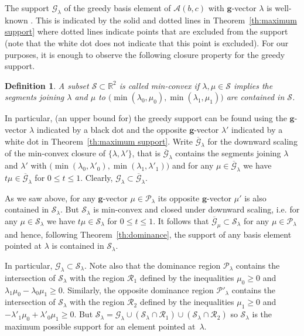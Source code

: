 \documentclass{amsart}
\newtheorem{definition}[theorem]{Definition}
\numberwithin{theorem}{section}
\newcommand{\bfg}{\boldsymbol{g}}
\newcommand{\cA}{\mathcal{A}}
\newcommand{\cG}{\mathcal{G}}
\newcommand{\cP}{\mathcal{P}}
\newcommand{\cR}{\mathcal{R}}
\newcommand{\cS}{\mathcal{S}}
\newcommand{\RR}{\mathbb{R}}
\begin{document}
  The support $\cG_\lambda$ of the greedy basis element of $\cA(b,c)$ with $\bfg$-vector $\lambda$ is well-known \cite{CGMMRSW17,LLZ14}.
  This is indicated by the solid and dotted lines in Theorem~\ref{th:maximum support} where dotted lines indicate points that are excluded from the support (note that the white dot does not indicate that this point is excluded).
  For our purposes, it is enough to observe the following closure property for the greedy support.
  \begin{definition}
    A subset $\cS\subset\RR^2$ is called \emph{min-convex} if $\lambda,\mu\in\cS$ implies the segments joining $\lambda$ and $\mu$ to $\big(\min(\lambda_0,\mu_0),\min(\lambda_1,\mu_1)\big)$ are contained in $\cS$.
  \end{definition}
  In particular, (an upper bound for) the greedy support can be found using the $\bfg$-vector $\lambda$ indicated by a black dot and the opposite $\bfg$-vector $\lambda'$ indicated by a white dot in Theorem~\ref{th:maximum support}.
  Write $\overline{\cG}_\lambda$ for the downward scaling of the min-convex closure of $\{\lambda,\lambda'\}$, that is $\overline{\cG}_\lambda$ contains the segments joining $\lambda$ and $\lambda'$ with $\big(\min(\lambda_0,\lambda'_0),\min(\lambda_1,\lambda'_1)\big)$ and for any $\mu\in\overline{\cG}_\lambda$ we have $t\mu\in\overline{\cG}_\lambda$ for $0\le t\le 1$.
  Clearly, $\cG_\lambda\subset\overline{\cG}_\lambda$.

  As we saw above, for any $\bfg$-vector $\mu\in\cP_\lambda$ its opposite $\bfg$-vector $\mu'$ is also contained in $\cS_\lambda$.
  But $\cS_\lambda$ is min-convex and closed under downward scaling, i.e. for any $\mu\in\cS_\lambda$ we have $t\mu\in\cS_\lambda$ for $0\le t\le 1$.
  It follows that $\overline{\cG}_\mu\subset\cS_\lambda$ for any $\mu\in\cP_\lambda$ and hence, following Theorem~\ref{th:dominance}, the support of any basis element pointed at $\lambda$ is contained in $\cS_\lambda$.

  In particular, $\cG_\lambda\subset\cS_\lambda$.
  Note also that the dominance region $\cP_\lambda$ contains the intersection of $\cS_\lambda$ with the region $\cR_1$ defined by the inequalities $\mu_0\ge0$ and $\lambda_1\mu_0-\lambda_0\mu_1\ge0$.
  Similarly, the opposite dominance region $\cP'_\lambda$ contains the intersection of $\cS_\lambda$ with the region $\cR_2$ defined by the inequalities $\mu_1\ge0$ and $-\lambda'_1\mu_0+\lambda'_0\mu_1\ge0$.
  But $\cS_\lambda=\cG_\lambda\cup(\cS_\lambda\cap\cR_1)\cup(\cS_\lambda\cap\cR_2)$ so $\cS_\lambda$ is the maximum possible support for an element pointed at~$\lambda$.
\end{document}
